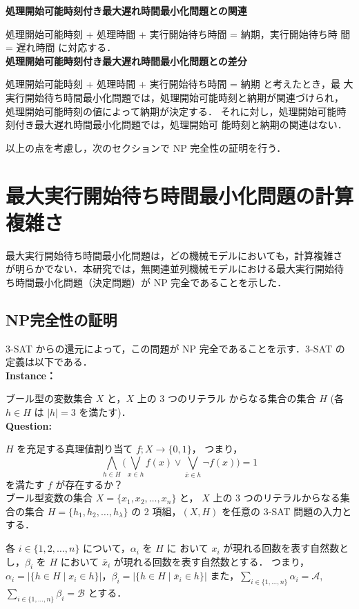 \documentclass[12pt]{optlab-bachelor}
\begin{document}
\textbf{処理開始可能時刻付き最大遅れ時間最小化問題との関連}

処理開始可能時刻 + 処理時間 + 実行開始待ち時間 = 納期，実行開始待ち時
間 = 遅れ時間 に対応する．\\

\textbf{処理開始可能時刻付き最大遅れ時間最小化問題との差分}

処理開始可能時刻 + 処理時間 + 実行開始待ち時間 = 納期 と考えたとき，最
大実行開始待ち時間最小化問題では，処理開始可能時刻と納期が関連づけられ，
処理開始可能時刻の値によって納期が決定する．
それに対し，処理開始可能時刻付き最大遅れ時間最小化問題では，処理開始可
能時刻と納期の関連はない．

以上の点を考慮し，次のセクションで NP 完全性の証明を行う．

\chapter{最大実行開始待ち時間最小化問題の計算複雑さ}
最大実行開始待ち時間最小化問題は，どの機械モデルにおいても，計算複雑さ
が明らかでない．本研究では，無関連並列機械モデルにおける最大実行開始待
ち時間最小化問題（決定問題）が NP 完全であることを示した．
\section{NP完全性の証明}
3-SAT からの還元によって，この問題が NP  完全であることを示す．3-SAT
の定義は以下である．\\

\noindent \textbf{Instance：}

ブール型の変数集合 $X$ と，$X$ 上の 3 つのリテラル
からなる集合の集合 $H$ (各 $h \in H$ は $|h| = 3$ を満たす)．\\

\noindent \textbf{Question:}

$H$ を充足する真理値割り当て $f ; X \to \{0,1\}$，
つまり，
$$\displaystyle \bigwedge_{h \in H} \bigg(\bigvee_{x \in h}f(x) \lor
\bigvee_{\bar x \in h}\lnot f(x) \bigg) = 1$$
を満たす $f$ が存在するか？\\

ブール型変数の集合 $X =\{x_1, x_2,\ldots ,x_n\}$ と， $X$ 上の 3 つのリテラルからなる集合の集合 $H =\{h_1, h_2,\ldots ,h_{\lambda}\}$ の 2 項組，$(X,H)$ を任意の 3-SAT 問題の入力とする．

各 $i \in \{1,2,\ldots, n\}$ について，$\alpha_i$ を $H$ に おいて $x_i$ が現れる回数を表す自然数とし，$\beta_i$ を $H$ において $\bar x_i$ が現れる回数を表す自然数とする．
つまり，$\alpha_i = \big|\{h \in H \mid x_i \in h\}\big|$，$\beta_i = \big|\{h \in H \mid \bar x_i \in h\}\big|$
また，$\displaystyle \sum_{i \in \{1,\ldots,n\}} \alpha_i = \mathcal{A}$, $\displaystyle \sum_{i \in \{1,\ldots,n\}} \beta_i = \mathcal{B}$  とする．
\end{document}
